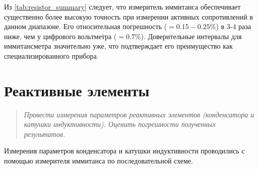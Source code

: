 Из \cref{tab:resistor_summary} следует, что измеритель иммитанса обеспечивает существенно более высокую точность при измерении активных сопротивлений в данном диапазоне. Его относительная погрешность ($= 0.15-0.25\%$) в 3-4 раза ниже, чем у цифрового вольтметра ($= 0.7\%$). Доверительные интервалы для иммитансметра значительно уже, что подтверждает его преимущество как специализированного прибора.

\section{ Реактивные элементы }
\begin{quote}
    \textit{Провести измерения параметров реактивных элементов (конденсатора и катушки индуктивности). Оценить погрешности полученных результатов.}
\end{quote}
Измерения параметров конденсатора и катушки индуктивности проводились с помощью измерителя иммитанса по последовательной схеме.

